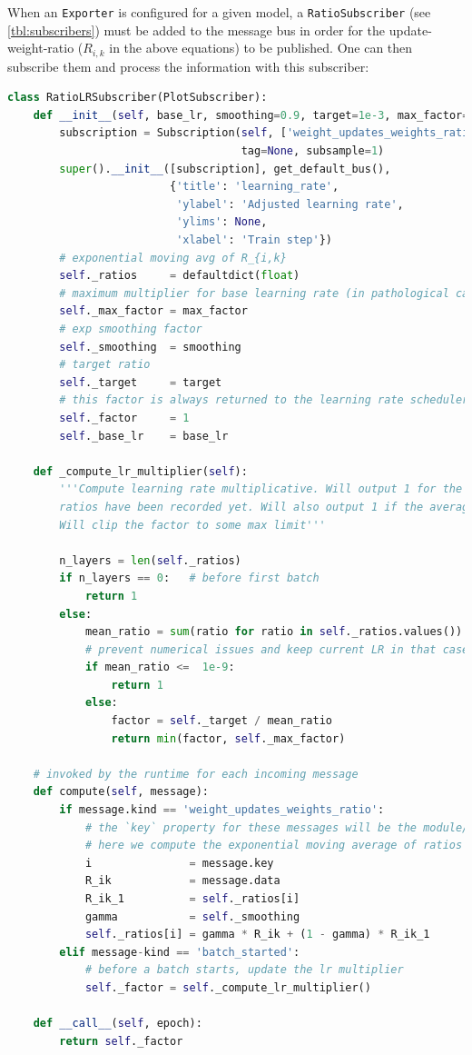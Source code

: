 When an \verb+Exporter+ is configured for a given model, a
\verb+RatioSubscriber+ (see \cref{tbl:subscribers}) must be added to the message
bus in order for the update-weight-ratio ($R_{i,k}$ in the above equations) to be
published. One can then subscribe them and process the information with this
subscriber:
\begin{lstlisting}[language=Python]
class RatioLRSubscriber(PlotSubscriber):
    def __init__(self, base_lr, smoothing=0.9, target=1e-3, max_factor=500):
        subscription = Subscription(self, ['weight_updates_weights_ratio', 'batch_started'],
                                    tag=None, subsample=1)
        super().__init__([subscription], get_default_bus(),
                         {'title': 'learning_rate',
                          'ylabel': 'Adjusted learning rate',
                          'ylims': None,
                          'xlabel': 'Train step'})
        # exponential moving avg of R_{i,k}
        self._ratios     = defaultdict(float)
        # maximum multiplier for base learning rate (in pathological cases)
        self._max_factor = max_factor
        # exp smoothing factor
        self._smoothing  = smoothing
        # target ratio
        self._target     = target
        # this factor is always returned to the learning rate scheduler
        self._factor     = 1
        self._base_lr    = base_lr

    def _compute_lr_multiplier(self):
        '''Compute learning rate multiplicative. Will output 1 for the first batch since no layer
        ratios have been recorded yet. Will also output 1 if the average ratio is close to 0.
        Will clip the factor to some max limit'''

        n_layers = len(self._ratios)
        if n_layers == 0:   # before first batch
            return 1
        else:
            mean_ratio = sum(ratio for ratio in self._ratios.values()) / n_layers
            # prevent numerical issues and keep current LR in that case
            if mean_ratio <=  1e-9:
                return 1
            else:
                factor = self._target / mean_ratio
                return min(factor, self._max_factor)

    # invoked by the runtime for each incoming message
    def compute(self, message):
        if message.kind == 'weight_updates_weights_ratio':
            # the `key` property for these messages will be the module/layer
            # here we compute the exponential moving average of ratios
            i               = message.key
            R_ik            = message.data
            R_ik_1          = self._ratios[i]
            gamma           = self._smoothing
            self._ratios[i] = gamma * R_ik + (1 - gamma) * R_ik_1
        elif message-kind == 'batch_started':
            # before a batch starts, update the lr multiplier
            self._factor = self._compute_lr_multiplier()

    def __call__(self, epoch):
        return self._factor
\end{lstlisting}

